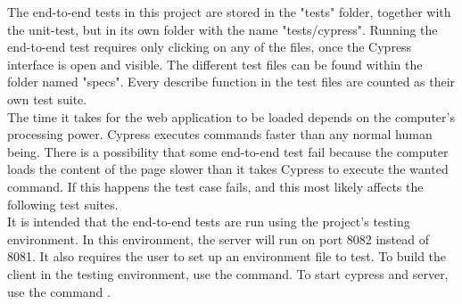 The end-to-end tests in this project are stored in the "tests" folder, together with the unit-test, but in its own folder with the name "tests/cypress". Running the end-to-end test requires only clicking on any of the files, once the Cypress interface is open and visible. The different test files can be found within the folder named "specs". Every describe function in the test files are counted as their own test suite. 
\\[11pt]
The time it takes for the web application to be loaded depends on the computer's processing power. Cypress executes commands faster than any normal human being. There is a possibility that some end-to-end test fail because the computer loads the content of the page slower than it takes Cypress to execute the wanted command. If this happens the test case fails, and this most likely affects the following test suites. 
\\[11pt]
It is intended that the end-to-end tests are run using the project's testing environment. In this environment, the server will run on port 8082 instead of 8081. It also requires the user to set up an environment file to test. To build the client in the testing environment, use the  command. To start cypress and server, use the command .